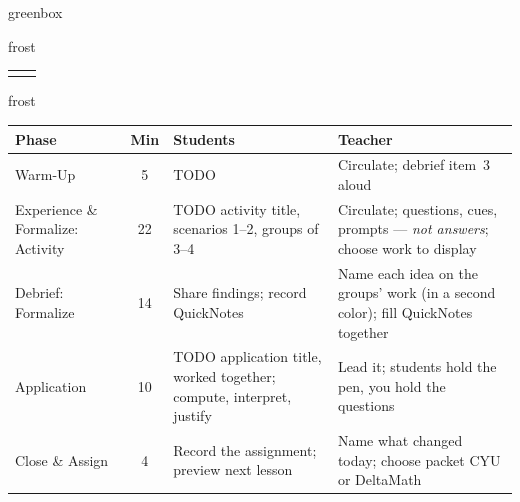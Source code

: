 \documentclass[10pt]{article}
\begin{document}
\begin{skillbox}{greenbox}
\end{skillbox}

\begin{fixedskillbox}{frost}
    \begin{tabularx}{\linewidth}{@{}X c@{}}
        \begin{minipage}[t]{0.55\linewidth}\vspace{0pt}
        \end{minipage}
        &
        \begin{minipage}[t]{0.38\linewidth}\vspace{0pt}\centering
        \end{minipage}
    \end{tabularx}
\end{fixedskillbox}

\begin{fixedskillbox}{frost}
\renewcommand{\arraystretch}{1.25}
\begin{tabularx}{\linewidth}{@{}l c X X@{}}
\textbf{Phase} & \textbf{Min} & \textbf{Students} & \textbf{Teacher} \\
\hline
Warm-Up & 5 & TODO & Circulate; debrief item~3 aloud \\
Experience \& Formalize: Activity & 22 & TODO activity title, scenarios 1--2, groups of 3--4 & Circulate; questions, cues, prompts --- \emph{not answers}; choose work to display \\
Debrief: Formalize & 14 & Share findings; record QuickNotes & Name each idea on the groups' work (in a second color); fill QuickNotes together \\
Application & 10 & TODO application title, worked together; compute, interpret, justify & Lead it; students hold the pen, you hold the questions \\
Close \& Assign & 4 & Record the assignment; preview next lesson & Name what changed today; choose packet CYU or DeltaMath \\
\end{tabularx}
\end{fixedskillbox}
\end{document}

